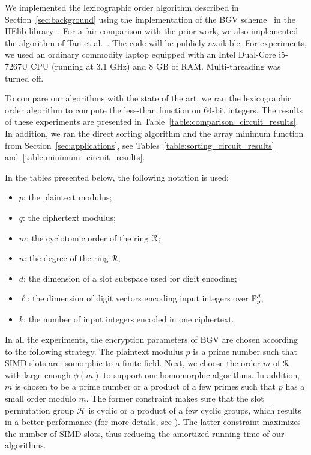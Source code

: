 We implemented the lexicographic order algorithm described in Section~\ref{sec:background} using the implementation of the BGV scheme~\cite{BGV12} in the HElib library~\cite{HElib}.
For a fair comparison with the prior work, we also implemented the algorithm of Tan et al.~\cite{TLWRK20}.
The code will be publicly available.
For experiments, we used an ordinary commodity laptop equipped with an Intel Dual-Core i5-7267U CPU (running at 3.1 GHz) and 8 GB of RAM.
Multi-threading was turned off.

To compare our algorithms with the state of the art, we ran the lexicographic order algorithm to compute the less-than function on 64-bit integers.
The results of these experiments are presented in Table~\ref{table:comparison_circuit_results}.
In addition, we ran the direct sorting algorithm and the array minimum function from Section~\ref{sec:applications}, see Tables~\ref{table:sorting_circuit_results} and~\ref{table:minimum_circuit_results}.

In the tables presented below, the following notation is used:
\begin{itemize}
  \item $p$: the plaintext modulus;
  \item $q$: the ciphertext modulus;
  \item $m$: the cyclotomic order of the ring $\mathcal{R}$;
  \item $n$: the degree of the ring $\mathcal{R}$;
  \item $d$: the dimension of a slot subspace used for digit encoding;
  \item $\ell$: the dimension of digit vectors encoding input integers over $\mathbb{F}_p^d$;
  \item $k$: the number of input integers encoded in one ciphertext.
\end{itemize}

In all the experiments, the encryption parameters of BGV are chosen according to the following strategy.
The plaintext modulus $p$ is a prime number such that SIMD slots are isomorphic to a finite field.
Next, we choose the order $m$ of $\mathcal{R}$ with large enough $\phi(m)$ to support our homomorphic algorithms.
In addition, $m$ is chosen to be a prime number or a product of a few primes such that $p$ has a small order modulo $m$.
The former constraint makes sure that the slot permutation group $\mathcal{H}$ is cyclic or a product of a few cyclic groups, which results in a better performance (for more details, see \cite[Appendix C.3]{GHS12}).
The latter constraint maximizes the number of SIMD slots, thus reducing the amortized running time of our algorithms.

